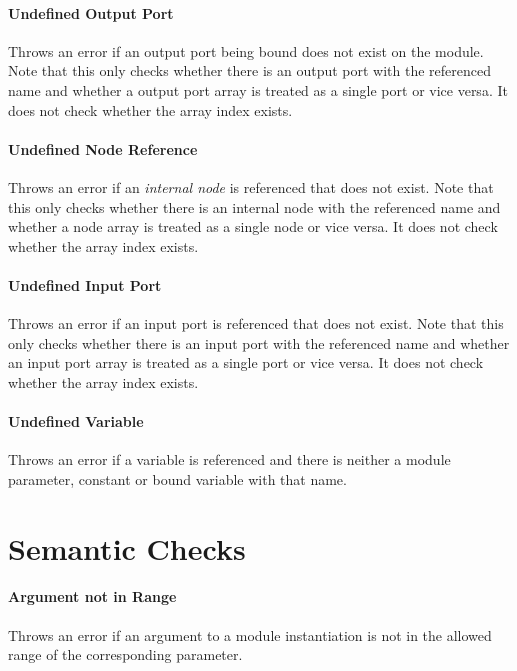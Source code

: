 \documentclass[a4paper,11pt,twoside]{report}
\begin{document}
{{{\paragraph{Undefined Output Port}
Throws an error if an output port being bound does not exist on the module.
Note that this only checks whether there is an output port with the referenced name and whether a output port array is treated as a single port or vice versa.
It does not check whether the array index exists.

\paragraph{Undefined Node Reference}
Throws an error if an \emph{internal node} is referenced that does not exist.
Note that this only checks whether there is an internal node with the referenced name and whether a node array is treated as a single node or vice versa.
It does not check whether the array index exists.

\paragraph{Undefined Input Port}
Throws an error if an input port is referenced that does not exist.
Note that this only checks whether there is an input port with the referenced name and whether an input port array is treated as a single port or vice versa.
It does not check whether the array index exists.

\paragraph{Undefined Variable}
Throws an error if a variable is referenced and there is neither a module parameter, constant or bound variable with that name.

\section{Semantic Checks}

\paragraph{Argument not in Range}
Throws an error if an argument to a module instantiation is not in the allowed range of the corresponding parameter.

}}}
\end{document}
